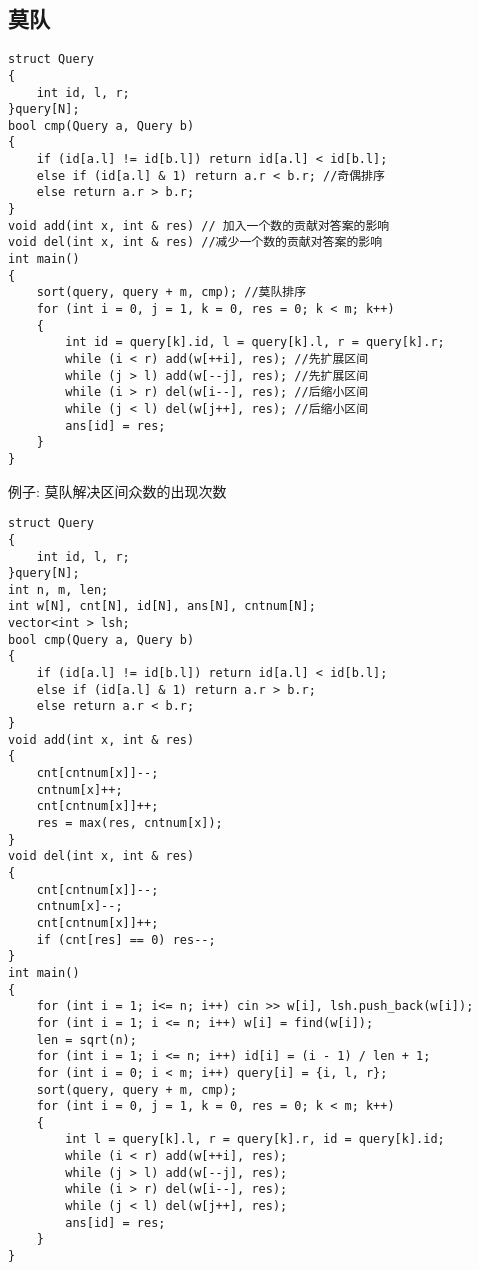 \documentclass[a4paper, fontset=none]{ctexart}
\begin{document}
\subsection{莫队}
\begin{verbatim}
struct Query
{
    int id, l, r;
}query[N];
bool cmp(Query a, Query b)
{
    if (id[a.l] != id[b.l]) return id[a.l] < id[b.l];
    else if (id[a.l] & 1) return a.r < b.r; //奇偶排序
    else return a.r > b.r;
}
void add(int x, int & res) // 加入一个数的贡献对答案的影响
void del(int x, int & res) //减少一个数的贡献对答案的影响
int main()
{
    sort(query, query + m, cmp); //莫队排序
    for (int i = 0, j = 1, k = 0, res = 0; k < m; k++)
    {
        int id = query[k].id, l = query[k].l, r = query[k].r;
        while (i < r) add(w[++i], res); //先扩展区间
        while (j > l) add(w[--j], res); //先扩展区间
        while (i > r) del(w[i--], res); //后缩小区间
        while (j < l) del(w[j++], res); //后缩小区间
        ans[id] = res;
    }
}
\end{verbatim}
例子: 莫队解决区间众数的出现次数
\begin{verbatim}
struct Query
{
    int id, l, r;
}query[N];
int n, m, len;
int w[N], cnt[N], id[N], ans[N], cntnum[N];
vector<int > lsh;
bool cmp(Query a, Query b)
{
    if (id[a.l] != id[b.l]) return id[a.l] < id[b.l];
    else if (id[a.l] & 1) return a.r > b.r;
    else return a.r < b.r;
}
void add(int x, int & res)
{
    cnt[cntnum[x]]--;
    cntnum[x]++;
    cnt[cntnum[x]]++;
    res = max(res, cntnum[x]);
}
void del(int x, int & res)
{
    cnt[cntnum[x]]--;
    cntnum[x]--;
    cnt[cntnum[x]]++;
    if (cnt[res] == 0) res--;
}
int main()
{
    for (int i = 1; i<= n; i++) cin >> w[i], lsh.push_back(w[i]);
    for (int i = 1; i <= n; i++) w[i] = find(w[i]);
    len = sqrt(n);
    for (int i = 1; i <= n; i++) id[i] = (i - 1) / len + 1;
    for (int i = 0; i < m; i++) query[i] = {i, l, r};
    sort(query, query + m, cmp);
    for (int i = 0, j = 1, k = 0, res = 0; k < m; k++)
    {
        int l = query[k].l, r = query[k].r, id = query[k].id;
        while (i < r) add(w[++i], res);
        while (j > l) add(w[--j], res);
        while (i > r) del(w[i--], res);
        while (j < l) del(w[j++], res);
        ans[id] = res;
    }
}
\end{verbatim}
\end{document}
